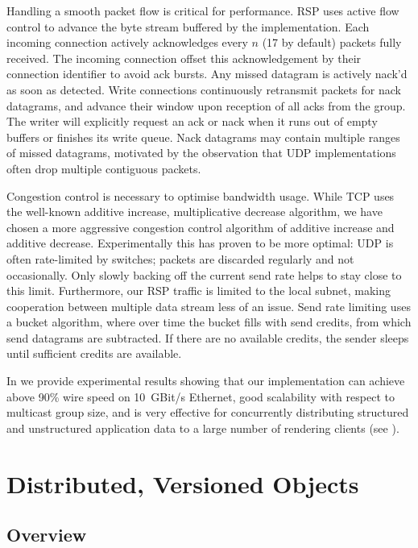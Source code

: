 Handling a smooth packet flow is critical for performance. RSP uses active flow
control to advance the byte stream buffered by the implementation. Each incoming
connection actively acknowledges every $n$ (17 by default) packets fully
received. The incoming connection offset this acknowledgement by their
connection identifier to avoid ack bursts. Any missed datagram is actively
nack'd as soon as detected. Write connections continuously retransmit packets
for nack datagrams, and advance their window upon reception of all acks from the
group. The writer will explicitly request an ack or nack when it runs out of
empty buffers or finishes its write queue. Nack datagrams may contain multiple
ranges of missed datagrams, motivated by the observation that UDP
implementations often drop multiple contiguous packets.

Congestion control is necessary to optimise bandwidth usage. While TCP uses the
well-known additive increase, multiplicative decrease algorithm, we have chosen
a more aggressive congestion control algorithm of additive increase and additive
decrease. Experimentally this has proven to be more optimal: UDP is often
rate-limited by switches; packets are discarded regularly and not
occasionally. Only slowly backing off the current send rate helps to stay close
to this limit. Furthermore, our RSP traffic is limited to the local subnet,
making cooperation between multiple data stream less of an issue. Send rate
limiting uses a bucket algorithm, where over time the bucket fills with send
credits, from which send datagrams are subtracted. If there are no available credits,
the sender sleeps until sufficient credits are available.

In \cite{ESP:18} we provide experimental results showing that our
implementation can achieve above 90\% wire speed on 10~GBit/s Ethernet,
good scalability with respect to multicast group size, and is very effective
for concurrently distributing structured and unstructured application data to a large number
of rendering clients (see ).


\section{Distributed, Versioned Objects}

\subsection{Overview}

